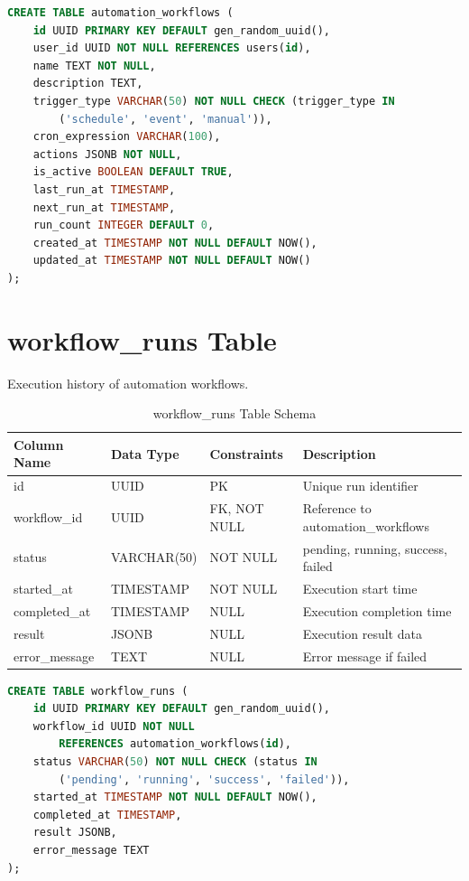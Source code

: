 \documentclass[12pt,a4paper]{report}
\begin{document}
\begin{lstlisting}[language=SQL,basicstyle=\ttfamily\small]
CREATE TABLE automation_workflows (
    id UUID PRIMARY KEY DEFAULT gen_random_uuid(),
    user_id UUID NOT NULL REFERENCES users(id),
    name TEXT NOT NULL,
    description TEXT,
    trigger_type VARCHAR(50) NOT NULL CHECK (trigger_type IN 
        ('schedule', 'event', 'manual')),
    cron_expression VARCHAR(100),
    actions JSONB NOT NULL,
    is_active BOOLEAN DEFAULT TRUE,
    last_run_at TIMESTAMP,
    next_run_at TIMESTAMP,
    run_count INTEGER DEFAULT 0,
    created_at TIMESTAMP NOT NULL DEFAULT NOW(),
    updated_at TIMESTAMP NOT NULL DEFAULT NOW()
);
\end{lstlisting}

\newpage
\section{workflow\_runs Table}

Execution history of automation workflows.

\begin{table}[h]
\centering
\small
\caption{workflow\_runs Table Schema}
\begin{tabular}{|l|l|l|l|}
\toprule
\textbf{Column Name} & \textbf{Data Type} & \textbf{Constraints} & \textbf{Description} \\
\midrule
id & UUID & PK & Unique run identifier \\
workflow\_id & UUID & FK, NOT NULL & Reference to automation\_workflows \\
status & VARCHAR(50) & NOT NULL & pending, running, success, failed \\
started\_at & TIMESTAMP & NOT NULL & Execution start time \\
completed\_at & TIMESTAMP & NULL & Execution completion time \\
result & JSONB & NULL & Execution result data \\
error\_message & TEXT & NULL & Error message if failed \\
\bottomrule
\end{tabular}
\end{table}

\begin{lstlisting}[language=SQL,basicstyle=\ttfamily\small]
CREATE TABLE workflow_runs (
    id UUID PRIMARY KEY DEFAULT gen_random_uuid(),
    workflow_id UUID NOT NULL 
        REFERENCES automation_workflows(id),
    status VARCHAR(50) NOT NULL CHECK (status IN 
        ('pending', 'running', 'success', 'failed')),
    started_at TIMESTAMP NOT NULL DEFAULT NOW(),
    completed_at TIMESTAMP,
    result JSONB,
    error_message TEXT
);
\end{lstlisting}
\end{document}
